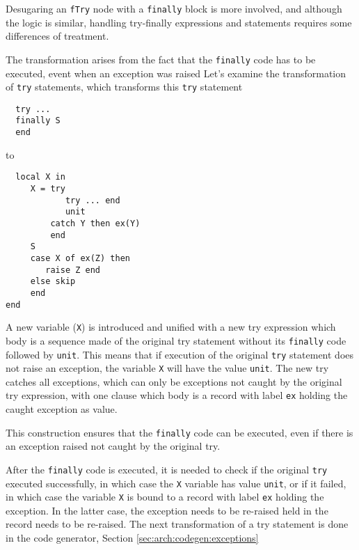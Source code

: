 \documentclass[a4paper]{memoir}
\begin{document}
Desugaring an \lstinline!fTry! node with a \lstinline!finally! block is more
involved, and although the logic is similar, handling try-finally expressions and
statements requires some differences of treatment.

The transformation arises from the fact that the \lstinline!finally! code has to
be executed, event when an exception was raised
Let's examine the transformation of \lstinline!try! statements, which
transforms this \lstinline!try! statement

\begin{lstlisting}
  try ...
  finally S 
  end
\end{lstlisting}

to

\begin{lstlisting}
  local X in 
     X = try 
            try ... end 
            unit 
         catch Y then ex(Y)
         end 
     S 
     case X of ex(Z) then 
        raise Z end 
     else skip 
     end 
end  
\end{lstlisting}


A new variable (\lstinline!X!) is introduced and unified with a new try
expression which body is a sequence made of the original try statement
without its \lstinline!finally! code followed by \lstinline!unit!.
This means that if execution of the original \lstinline!try! statement does not raise an
exception, the variable \lstinline!X! will have the value \lstinline!unit!.
The new try catches all exceptions, which can only be exceptions not caught
by the original try expression, with one clause which body is a record with label
\lstinline!ex! holding the caught exception as value.

This construction ensures that the \lstinline!finally! code can be executed,
even if there is an exception raised not caught by the original try.

After the \lstinline!finally! code is executed, it is needed to check if the
original \lstinline!try! executed successfully, in which case the \lstinline!X!
variable has value \lstinline!unit!, or if it failed, in which case the variable
\lstinline!X! is bound to a record with label \lstinline!ex! holding the
exception. In the latter case, the exception needs to be re-raised held in the
record needs to be re-raised.
The next transformation of a try statement is done in the code generator,
Section \ref{sec:arch:codegen:exceptions}
\end{document}
